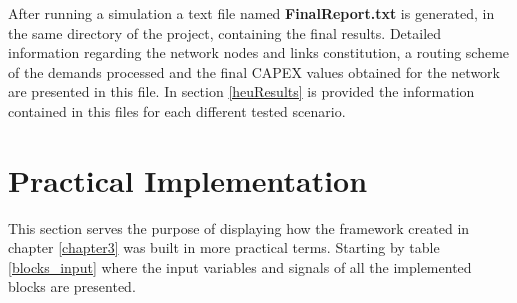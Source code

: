 After running a simulation a text file named \textbf{FinalReport.txt} is generated, in the same directory of the project, containing the final results. Detailed information regarding the network nodes and links constitution, a routing scheme of the demands processed and the final CAPEX values obtained for the network are presented in this file. In section \ref{heuResults} is provided the information contained in this files for each different tested scenario.
\vspace{11pt}


\section{Practical Implementation}
\label{practical}

This section serves the purpose of displaying how the framework created in chapter    \ref{chapter3} was built in more practical terms. Starting by table \ref{blocks_input} where the input variables and signals of all the implemented blocks are presented.

